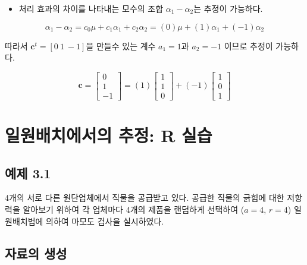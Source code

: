 \documentclass[
]{book}
\providecommand{\tightlist}{%
  \setlength{\itemsep}{0pt}\setlength{\parskip}{0pt}}
\newcommand{\bm}[1]{\boldsymbol{\mathbf{#1}}}
\begin{document}
\begin{itemize}
\tightlist
\item
  처리 효과의 차이를 나타내는 모수의 조합 \(\alpha_1-\alpha_2\)는 추정이 가능하다.
\end{itemize}

\[ \alpha_1 -\alpha_2= c_0 \mu + c_1 \alpha_1 + c_2 \alpha_2 = (0) \mu + (1) \alpha_1 + (-1) \alpha_2 \]

따라서 \(\bm c^t = [0~1~-1]\)을 만들수 있는 계수 \(a_1=1\)과 \(a_2=-1\) 이므로 추정이 가능하다.

\begin{equation*}
\bm c =
\begin{bmatrix}
0 \\
1 \\
-1 
\end{bmatrix}
= 
(1)
\begin{bmatrix}
1 \\
1 \\
0 
\end{bmatrix}
+ 
(-1)
\begin{bmatrix}
1 \\
0 \\
1 
\end{bmatrix}
\end{equation*}

\hypertarget{rprogram}{%
\chapter{일원배치에서의 추정: R 실습}\label{rprogram}}

\hypertarget{uxc608uxc81c-3.1}{%
\section{예제 3.1}\label{uxc608uxc81c-3.1}}

4개의 서로 다른 원단업체에서 직물을 공급받고 있다. 공급한 직물의 긁힘에
대한 저항력을 알아보기 위하여 각 업체마다 4개의 제품을 랜덤하게 선택하여
(\(a=4\), \(r=4\)) 일원배치법에 의하여 마모도 검사을 실시하였다.

\hypertarget{uxc790uxb8ccuxc758-uxc0dduxc131}{%
\section{자료의 생성}\label{uxc790uxb8ccuxc758-uxc0dduxc131}}
\end{document}
